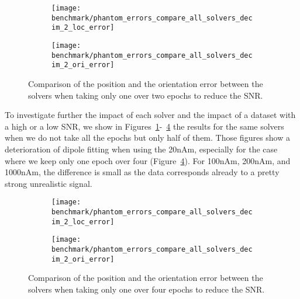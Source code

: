 \begin{figure}[p]
	\centering
    \begin{subfigure}{0.9\linewidth}
		\centering
		\texttt{[image: benchmark/phantom\_errors\_compare\_all\_solvers\_decim\_2\_loc\_error]}
	    \caption{\label{fig:all_solvers_loc_error_decim_2}}
    \end{subfigure}
	\hspace{5cm}
	\hfill
    \begin{subfigure}{0.9\linewidth}  
		\centering 
		\texttt{[image: benchmark/phantom\_errors\_compare\_all\_solvers\_decim\_2\_ori\_error]}
		\caption{\label{fig:all_solvers_ori_error_decim_2}}
	\end{subfigure}

		\caption{Comparison of the position and the orientation error between the solvers when taking only one over two epochs to reduce the SNR.\label{all_solvers_loc_error_decim_2}}
\end{figure}

To investigate further the impact of each solver and the impact of a dataset with a high or a low SNR, we show in Figures~\ref{fig:all_solvers_loc_error_decim_2}-~\ref{fig:all_solvers_loc_error_decim_4} the results for the same solvers when we do not take all the epochs but only half of them. Those figures show a deterioration of dipole fitting when using the 20nAm, especially for the case where we keep only one epoch over four (Figure~\ref{fig:all_solvers_loc_error_decim_4}). For 100nAm, 200nAm, and 1000nAm, the difference is small as the data corresponds already to a pretty strong unrealistic signal. %

\begin{figure}[p]
	\centering
    \begin{subfigure}{0.9\linewidth}
		\centering
		\texttt{[image: benchmark/phantom\_errors\_compare\_all\_solvers\_decim\_2\_loc\_error]}
	    \caption{\label{fig:all_solvers_loc_error_decim_4}}
    \end{subfigure}
	\hspace{5cm}
	\hfill
    \begin{subfigure}{0.9\linewidth}  
		\centering 
		\texttt{[image: benchmark/phantom\_errors\_compare\_all\_solvers\_decim\_2\_ori\_error]}
		\caption{\label{fig:all_solvers_ori_error_decim_4}}
	\end{subfigure}

		\caption{Comparison of the position and the orientation error between the solvers when taking only one over four epochs to reduce the SNR.\label{all_solvers_loc_error_decim_4}}
\end{figure}

